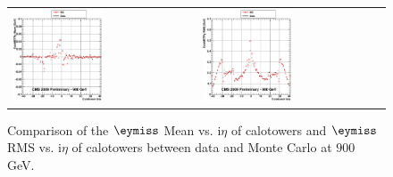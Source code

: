 \begin{figure}[h!]
 \centering
 \begin{tabular}{ll}
  \includegraphics[width=0.5\textwidth]{plots_DataVsMC_MB_900GeV/g_calometPyMean_vs_ieta_900.eps} &
  \includegraphics[width=0.5\textwidth]{plots_DataVsMC_MB_900GeV/g_calometPyRMS_vs_ieta_900.eps} \\
 \end{tabular}
 \caption{\small Comparison of the $\eymiss$ Mean vs. i$\eta$ of calotowers and $\eymiss$ RMS vs. i$\eta$ of calotowers between 
          data and Monte Carlo at $900$ GeV.\label{fig:METy_MeanRMS_vs_ieta_900}}
\end{figure}

\clearpage
